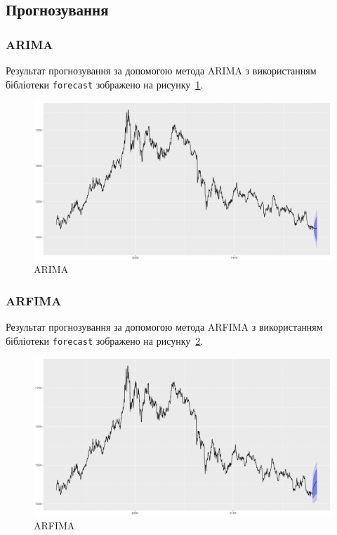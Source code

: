 \subsection{Прогнозування}
\subsubsection{ARIMA}
Результат прогнозування за допомогою метода ARIMA з використанням бібліотеки \texttt{forecast} зображено на рисунку~\ref{fig:out_arima}.  

\begin{figure}[H]
    \centering
        \includegraphics[width=1\textwidth]{out_arima}
    \caption{ARIMA}
    \label{fig:out_arima}
\end{figure} 

\subsubsection{ARFIMA}
Результат прогнозування за допомогою метода ARFIMA з використанням бібліотеки \texttt{forecast} зображено на рисунку~\ref{fig:out_arfima}.  

\begin{figure}[H]
    \centering
        \includegraphics[width=1\textwidth]{out_arfima}
    \caption{ARFIMA}
    \label{fig:out_arfima}
\end{figure} 

